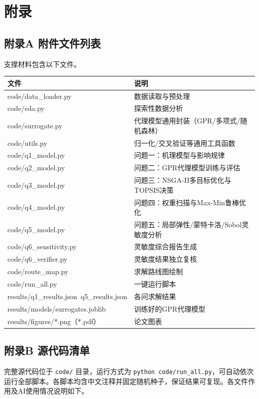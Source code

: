 \documentclass[withoutpreface]{cumcmthesis}
\begin{document}
\section{附录}
\subsection{附录A 附件文件列表}
支撑材料包含以下文件。

\begin{table}[htbp]
\centering
\small
\begin{tabularx}{\textwidth}{XX}
\toprule
文件 & 说明 \\
\midrule
code/data\_loader.py & 数据读取与预处理 \\
code/eda.py & 探索性数据分析 \\
code/surrogate.py & 代理模型通用封装（GPR/多项式/随机森林） \\
code/utils.py & 归一化/交叉验证等通用工具函数 \\
code/q1\_model.py & 问题一：机理模型与影响规律 \\
code/q2\_model.py & 问题二：GPR代理模型训练与评估 \\
code/q3\_model.py & 问题三：NSGA-II多目标优化与TOPSIS决策 \\
code/q4\_model.py & 问题四：权重扫描与Max-Min鲁棒优化 \\
code/q5\_model.py & 问题五：局部弹性/蒙特卡洛/Sobol灵敏度分析 \\
code/q6\_sensitivity.py & 灵敏度综合报告生成 \\
code/q6\_verifier.py & 灵敏度结果独立复核 \\
code/route\_map.py & 求解路线图绘制 \\
code/run\_all.py & 一键运行脚本 \\
results/q1\_results.json~q5\_results.json & 各问求解结果 \\
results/models/surrogates.joblib & 训练好的GPR代理模型 \\
results/figures/*.png（*.pdf） & 论文图表 \\
\bottomrule
\end{tabularx}
\end{table}
\subsection{附录B 源代码清单}
完整源代码位于 \texttt{code/} 目录，运行方式为 \texttt{python code/run\_all.py}，可自动依次运行全部脚本。各脚本均含中文注释并固定随机种子，保证结果可复现。各文件作用及AI使用情况说明如下。
\end{document}
